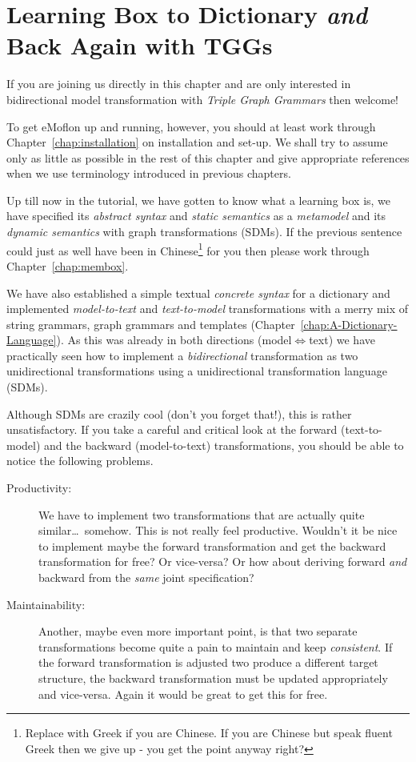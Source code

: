\chapter{Learning Box to Dictionary \emph{and} Back Again with TGGs}
\label{Learning-Box-to-Dictionary-and-Back-Again}

If you are joining us directly in this chapter and are only interested in bidirectional model transformation with \emph{Triple Graph Grammars} then welcome!

To get eMoflon up and running, however, you should at least work through Chapter~\ref{chap:installation} on installation and set-up.
We shall try to assume only as little as possible in the rest of this chapter and give appropriate references when we use terminology introduced in previous chapters.

Up till now in the tutorial, we have gotten to know what a learning box is, we have specified its \emph{abstract syntax} and \emph{static semantics} as a \emph{metamodel} and its \emph{dynamic semantics} with graph transformations (SDMs).
If the previous sentence could just as well have been in Chinese\footnote{Replace with Greek if you are Chinese.  If you are Chinese but speak fluent Greek then we give up - you get the point anyway right?} for you then please work through Chapter~\ref{chap:membox}.

We have also established a simple textual \emph{concrete syntax} for a dictionary and implemented \emph{model-to-text} and \emph{text-to-model} transformations with a merry mix of string grammars, graph grammars and templates (Chapter~\ref{chap:A-Dictionary-Language}).
As this was already in both directions (model$\Leftrightarrow$text) we have practically seen how to implement a \emph{bidirectional} transformation as two unidirectional transformations using a unidirectional transformation language (SDMs).

Although SDMs are crazily cool (don't you forget that!), this is rather unsatisfactory.  
If you take a careful and critical look at the forward (text-to-model) and the backward (model-to-text) transformations, you should be able to notice the following problems.
\begin{description}
  \item[Productivity:] We have to implement two transformations that are actually quite similar\ldots ~somehow.  This is not really feel productive.  Wouldn't it be nice to implement maybe the forward transformation and get the backward transformation for free?  Or vice-versa?  Or how about deriving forward \emph{and} backward from the \emph{same} joint specification?
  \item[Maintainability:] Another, maybe even more important point, is that two separate transformations become quite a pain to maintain and keep \emph{consistent}.  If the forward transformation is adjusted two produce a different target structure, the backward transformation must be updated appropriately and vice-versa.  Again it would be great to get this for free. 
\end{description}

